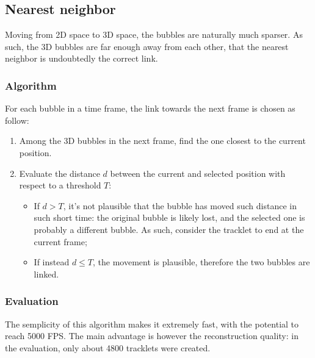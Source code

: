 \subsection{Nearest neighbor}
\label{sec:link3d:NN}

Moving from 2D space to 3D space, the bubbles are naturally much sparser.
As such, the 3D bubbles are far enough away from each other, that the nearest neighbor is undoubtedly the correct link.

\subsubsection{Algorithm}

For each bubble in a time frame, the link towards the next frame is chosen as follow:
\begin{enumerate}
	\itemsep 0em
	\item Among the 3D bubbles in the next frame, find the one closest to the current position.
	\item Evaluate the distance $d$ between the current and selected position with respect to a threshold $T$:
	      \begin{itemize}
		      \item If $d>T$, it's not plausible that the bubble has moved such distance in such short time: the original bubble is likely lost, and the selected one is probably a different bubble. As such, consider the tracklet to end at the current frame;
		      \item If instead $d\le T$, the movement is plausible, therefore the two bubbles are linked.
	      \end{itemize}
\end{enumerate}

\subsubsection{Evaluation}

The semplicity of this algorithm makes it extremely fast, with the potential to reach 5000 FPS.
The main advantage is however the reconstruction quality: in the evaluation, only about 4800 tracklets were created.

